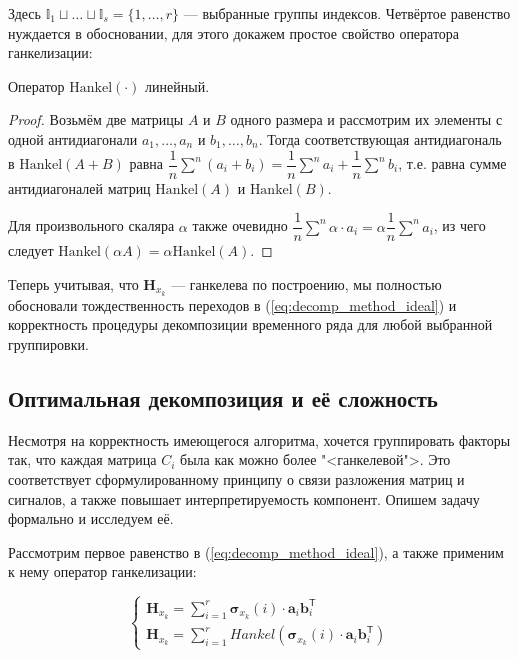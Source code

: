 	Здесь $ \mathbb{I}_1 \sqcup \ldots \sqcup \mathbb{I}_s = \{1, \ldots, r\} $ --- выбранные группы индексов. Четвёртое равенство нуждается в обосновании, для этого докажем простое свойство оператора ганкелизации:
	
	\begin{Lem}
		Оператор $ \text{Hankel}(\cdot) $ линейный.
	\end{Lem}
	
	\begin{proof}
		Возьмём две матрицы $ A $ и $ B $ одного размера и рассмотрим их элементы с одной антидиагонали $ a_1, \ldots, a_n $ и $ b_1, \ldots, b_n $. Тогда соответствующая антидиагональ в $ \text{Hankel}(A + B) $ равна $ \dfrac{1}{n} \sum\limits^n (a_i + b_i) = \dfrac{1}{n} \sum\limits^n a_i + \dfrac{1}{n} \sum\limits^n b_i $, т.е. равна сумме антидиагоналей матриц $ \text{Hankel}(A) $ и $ \text{Hankel}(B) $.
		
		Для произвольного скаляра $ \alpha $ также очевидно $ \dfrac{1}{n} \sum\limits^n \alpha \cdot a_i = \alpha \dfrac{1}{n} \sum\limits^n a_i $, из чего следует $ \text{Hankel}(\alpha A) = \alpha \text{Hankel}(A) $.
	\end{proof}
	
	Теперь учитывая, что $ \mathbf{H}_{x_k} $ --- ганкелева по построению, мы полностью обосновали тождественность переходов в (\ref{eq:decomp_method_ideal}) и корректность процедуры декомпозиции временного ряда для любой выбранной группировки.
	
	\subsection*{Оптимальная декомпозиция и её сложность}\label{sec:optimal_decomp}
	
	Несмотря на корректность имеющегося алгоритма, хочется группировать факторы так, что каждая матрица $ C_i $ была как можно более "<ганкелевой">. Это соответствует сформулированному принципу о связи разложения матриц и сигналов, а также повышает интерпретируемость компонент. Опишем задачу формально и исследуем её.
	
	Рассмотрим первое равенство в (\ref{eq:decomp_method_ideal}), а также применим к нему оператор ганкелизации:
	
	\begin{equation*}
		\begin{cases*}
			\mathbf{H}_{x_k} = \sum\limits_{i = 1}^{r} \boldsymbol{\sigma}_{x_k}(i) \cdot \mathbf{a}_i  \mathbf{b}_i^{\mathsf{T}} \\
			\mathbf{H}_{x_k} = \sum\limits_{i = 1}^{r} Hankel(\boldsymbol{\sigma}_{x_k}(i) \cdot \mathbf{a}_i  \mathbf{b}_i^{\mathsf{T}})
		\end{cases*}
	\end{equation*}
	
